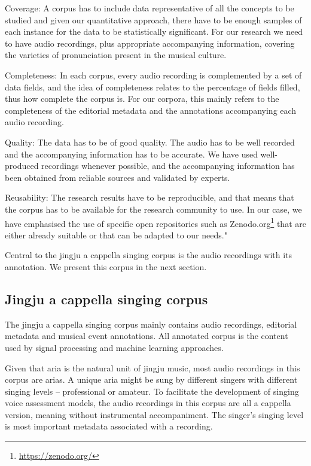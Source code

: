 Coverage: A corpus has to include data representative of all the concepts to be studied and given our quantitative approach, there have to be enough samples of each instance for the data to be statistically significant. For our research we need to have audio recordings, plus appropriate accompanying information, covering the varieties of pronunciation present in the musical culture.

Completeness: In each corpus, every audio recording is complemented by a set of data fields, and the idea of completeness relates to the percentage of fields filled, thus how complete the corpus is. For our corpora, this mainly refers to the completeness of the editorial metadata and the annotations accompanying each audio recording.

Quality: The data has to be of good quality. The audio has to be well recorded and the accompanying information has to be accurate. We have used well-produced recordings whenever possible, and the accompanying information has been obtained from reliable sources and validated by experts.

Reusability: The research results have to be reproducible, and that means that the corpus has to be available for the research community to use. In our case, we have emphasised the use of specific open repositories such as Zenodo.org\footnote{\url{https://zenodo.org/}} that are either already suitable or that can be adapted to our needs."

Central to the jingju a cappella singing corpus is the audio recordings with its annotation. We present this corpus in the next section.

\subsection{Jingju a cappella singing corpus}\label{sec:ch4:jingju_acappella_singing_corpus}

The jingju a cappella singing corpus mainly contains audio recordings, editorial metadata and musical event annotations. All annotated corpus is the content used by signal processing and machine learning approaches.

Given that aria is the natural unit of jingju music, most audio recordings in this corpus are arias. A unique aria might be sung by different singers with different singing levels -- professional or amateur. To facilitate the development of singing voice assessment models, the audio recordings in this corpus are all a cappella version, meaning without instrumental accompaniment. The singer's singing level is most important metadata associated with a recording.

